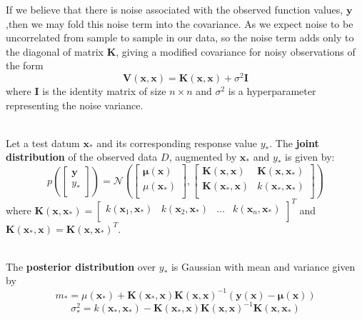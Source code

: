 \documentclass[12pt,a4paper]{article}
\begin{document}
\newpage

\noindent
If we believe that there is noise associated with the observed function values, $\mathbf{y}$,then we may fold this noise term into the covariance. As we expect noise to be uncorrelated from
sample to sample in our data, so the noise term adds only to the diagonal of matrix $\mathbf{K}$, giving a modified covariance for noisy observations of the form
$$
\mathbf{V}(\mathbf{x},\mathbf{x}) = \mathbf{K}(\mathbf{x},\mathbf{x}) + \sigma^2\mathbf{I}
$$
where $\mathbf{I}$ is the identity matrix of size $n \times n$ and $\sigma^2$ is a hyperparameter representing the noise variance.

\noindent
\\Let a test datum $\mathbf{x}_{*}$ and its corresponding response value $y_{*}$. The \textbf{joint distribution} of the observed data $D$, augmented by $\mathbf{x}_{*}$ and $y_{*}$ is given by:
$$
p\left(\begin{bmatrix} \mathbf{y}\\ y_{*}\\ \end{bmatrix}\right) = \mathcal{N}\left(\begin{bmatrix} \boldsymbol\mu({\mathbf{x}})\\ \mu(\mathbf{x}_{*})\\ \end{bmatrix} ,
\begin{bmatrix}
\mathbf{K}(\mathbf{x},\mathbf{x}) & \mathbf{K}(\mathbf{x},\mathbf{x}_{*}) \\
\mathbf{K}(\mathbf{x}_{*},\mathbf{x}) & k(\mathbf{x}_{*},\mathbf{x}_{*}) \\
\end{bmatrix} \right)
$$
where $\mathbf{K}(\mathbf{x},\mathbf{x}_{*}) = \begin{bmatrix} k(\mathbf{x}_1,\mathbf{x}_{*}) & k(\mathbf{x}_2,\mathbf{x}_{*}) & \dots & k(\mathbf{x}_n,\mathbf{x}_{*})\\ \end{bmatrix}^{T}$ and $\mathbf{K}(\mathbf{x}_{*},\mathbf{x}) = \mathbf{K}(\mathbf{x},\mathbf{x}_{*})^{T}$.

\noindent
\\The \textbf{posterior distribution} over $y_{*}$ is Gaussian with mean and variance given by
$$
m_{*} = \mu(\mathbf{x}_{*}) + \mathbf{K}(\mathbf{x}_{*},\mathbf{x})\mathbf{K}(\mathbf{x},\mathbf{x})^{-1}(\mathbf{y}(\mathbf{x}) - \boldsymbol\mu(\mathbf{x}))
$$
$$
\sigma^{2}_{*} = k(\mathbf{x}_{*},\mathbf{x}_{*}) - \mathbf{K}(\mathbf{x}_{*},\mathbf{x})\mathbf{K}(\mathbf{x},\mathbf{x})^{-1}\mathbf{K}(\mathbf{x},\mathbf{x}_{*})
$$
\end{document}
